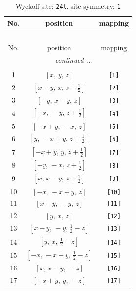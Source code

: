 \documentclass[fleqn,8pt]{jsarticle}
\begin{document}
\begin{longtable}{ccc}
\caption{Wyckoff site: {\tt 24l}, site symmetry: {\tt 1}}
 \\
 \hline \hline
No. & position & mapping \\ \hline \endfirsthead

\multicolumn{2}{l}{\tablename\ \thetable{}} \\
 \hline \hline
No. & position & mapping \\ \hline \endhead

 \hline \hline
\multicolumn{2}{r}{\footnotesize\it continued ...} \\ \endfoot

 \hline \hline
\multicolumn{2}{r}{} \\ \endlastfoot

1 & $\left[ x,\, y,\, z \right]$ & {\tt [1]} \\ \hline
2 & $\left[ x - y,\, x,\, z + \frac{1}{2} \right]$ & {\tt [2]} \\ \hline
3 & $\left[ - y,\, x - y,\, z \right]$ & {\tt [3]} \\ \hline
4 & $\left[ - x,\, - y,\, z + \frac{1}{2} \right]$ & {\tt [4]} \\ \hline
5 & $\left[ - x + y,\, - x,\, z \right]$ & {\tt [5]} \\ \hline
6 & $\left[ y,\, - x + y,\, z + \frac{1}{2} \right]$ & {\tt [6]} \\ \hline
7 & $\left[ - x + y,\, y,\, z + \frac{1}{2} \right]$ & {\tt [7]} \\ \hline
8 & $\left[ - y,\, - x,\, z + \frac{1}{2} \right]$ & {\tt [8]} \\ \hline
9 & $\left[ x,\, x - y,\, z + \frac{1}{2} \right]$ & {\tt [9]} \\ \hline
10 & $\left[ - x,\, - x + y,\, z \right]$ & {\tt [10]} \\ \hline
11 & $\left[ x - y,\, - y,\, z \right]$ & {\tt [11]} \\ \hline
12 & $\left[ y,\, x,\, z \right]$ & {\tt [12]} \\ \hline
13 & $\left[ x - y,\, - y,\, \frac{1}{2} - z \right]$ & {\tt [13]} \\ \hline
14 & $\left[ y,\, x,\, \frac{1}{2} - z \right]$ & {\tt [14]} \\ \hline
15 & $\left[ - x,\, - x + y,\, \frac{1}{2} - z \right]$ & {\tt [15]} \\ \hline
16 & $\left[ x,\, x - y,\, - z \right]$ & {\tt [16]} \\ \hline
17 & $\left[ - x + y,\, y,\, - z \right]$ & {\tt [17]} \\ \hline

\end{longtable}
\end{document}
